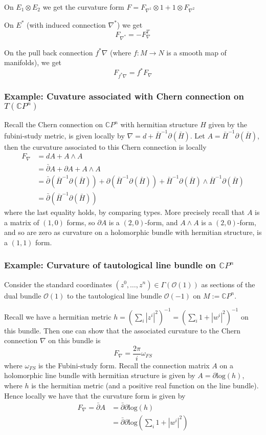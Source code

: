 \documentclass[a4paper]{article}
\theoremstyle{definition} \newtheorem*{definition}{Definition}
\theoremstyle{definition} \newtheorem*{definitions}{Definitions}
\theoremstyle{plain} \newtheorem{theorem}{Theorem}[section]
\theoremstyle{plain} \newtheorem{proposition}[theorem]{Proposition}
\theoremstyle{plain} \newtheorem{corollary}[theorem]{Corollary}
\theoremstyle{plain} \newtheorem{lemma}[theorem]{Lemma}
\theoremstyle{plain} \newtheorem{example}[theorem]{Example}
\newcommand{\complexnos}{\mathbb{C}}
\begin{document}
On $E_1\otimes E_2$ we get the curvature form
$F=F_{\nabla^1}\otimes 1 + 1\otimes F_{\nabla^2}$

On $E^*$ (with induced connection $\nabla^*$) we get
$$F_{\nabla^*}=-F_{\nabla}^T$$

On the pull back connection $f^*\nabla$ (where $f:M\to N$ is a smooth map of manifolds), we get
$$F_{f^* \nabla} = f^* F_\nabla$$

\subsubsection{Example: Cuvature associated with Chern connection on $T (\complexnos P^n)$}

Recall the Chern connection on $\complexnos P^n$ with hermitian structure $H$ given by the fubini-study metric, is given locally by $\nabla = d+\bar{H}^{-1}\partial(\bar{H})$. Let $A=\bar{H}^{-1}\partial(\bar{H})$, then the curvature associated to this Chern connection is locally 
\begin{align*}
    F_\nabla & = dA + A\wedge A \\
    & = \bar{\partial} A + \partial A + A\wedge A \\
    & = \bar{\partial}(\bar{H}^{-1}\partial(\bar{H})) + \partial(\bar{H}^{-1}\partial(\bar{H})) + \bar{H}^{-1}\partial(\bar{H}) \wedge \bar{H}^{-1}\partial(\bar{H}) \\
    & = \bar{\partial}(\bar{H}^{-1}\partial(\bar{H}))
\end{align*}
where the last equality holds, by comparing types. More precisely recall that $A$ is a matrix of $(1, 0)$ forms, so $\partial A$ is a $(2,0)$-form, and $A\wedge A$ is a $(2,0)$-form, and so are zero as curvature on a holomorphic bundle with hermitian structure, is a $(1,1)$ form.

\subsubsection{Example: Curvature of tautological line bundle on $\complexnos P^n$}
Consider the standard coordinates $(z^0, \ldots, z^n)\in \Gamma(\mathcal{O}(1))$ as sections of the dual bundle $\mathcal{O}(1)$ to the tautological line bundle $\mathcal{O}(-1)$ on $M:=\complexnos P^n$. 

 Recall we have a hermitian metric $h=(\sum_i |z^i|^2)^{-1}=(\sum_i 1+|w^i|^2)^{-1}$ on this bundle. Then one can show that the associated curvature to the Chern connection $\nabla$ on this bundle is
$$F_\nabla = \frac{2\pi}{i} \omega_{FS} $$
where $\omega_{FS}$ is the Fubini-study form. Recall the connection matrix $A$ on a holomorphic line bundle with hermitian structure is given by $A = \partial \text{log}(h)$, where $h$ is the hermitian metric (and a positive real function on the line bundle). Hence locally we have that the curvature form is given by 
\begin{align*}
F_\nabla = \bar{\partial}A & =  \bar{\partial}\partial \text{log}(h) \\
& = \bar{\partial}\partial \text{log}(\sum_i 1+|w^i|^2)
\end{align*}
\end{document}

